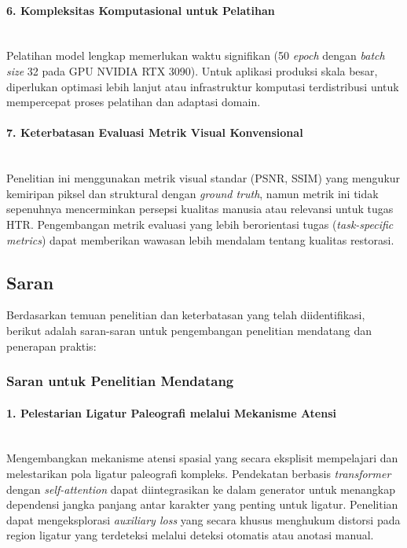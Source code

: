 \documentclass[12pt,a4paper]{article}
\begin{document}
\paragraph{6. Kompleksitas Komputasional untuk Pelatihan} \mbox{}\\[0.1em]
Pelatihan model lengkap memerlukan waktu signifikan (50 \textit{epoch} dengan \textit{batch size} 32 pada GPU NVIDIA RTX 3090). Untuk aplikasi produksi skala besar, diperlukan optimasi lebih lanjut atau infrastruktur komputasi terdistribusi untuk mempercepat proses pelatihan dan adaptasi domain.

\paragraph{7. Keterbatasan Evaluasi Metrik Visual Konvensional} \mbox{}\\[0.1em]
Penelitian ini menggunakan metrik visual standar (PSNR, SSIM) yang mengukur kemiripan piksel dan struktural dengan \textit{ground truth}, namun metrik ini tidak sepenuhnya mencerminkan persepsi kualitas manusia atau relevansi untuk tugas HTR. Pengembangan metrik evaluasi yang lebih berorientasi tugas (\textit{task-specific metrics}) dapat memberikan wawasan lebih mendalam tentang kualitas restorasi.

\vspace{0.8em}

\subsection{Saran}
\label{subsec:saran}
\vspace{0.8em}

Berdasarkan temuan penelitian dan keterbatasan yang telah diidentifikasi, berikut adalah saran-saran untuk pengembangan penelitian mendatang dan penerapan praktis:

\subsubsection{Saran untuk Penelitian Mendatang}
\label{subsubsec:saran-penelitian}

\paragraph{1. Pelestarian Ligatur Paleografi melalui Mekanisme Atensi} \mbox{}\\[0.1em]
Mengembangkan mekanisme atensi spasial yang secara eksplisit mempelajari dan melestarikan pola ligatur paleografi kompleks. Pendekatan berbasis \textit{transformer} dengan \textit{self-attention} dapat diintegrasikan ke dalam generator untuk menangkap dependensi jangka panjang antar karakter yang penting untuk ligatur. Penelitian dapat mengeksplorasi \textit{auxiliary loss} yang secara khusus menghukum distorsi pada region ligatur yang terdeteksi melalui deteksi otomatis atau anotasi manual.
\end{document}
